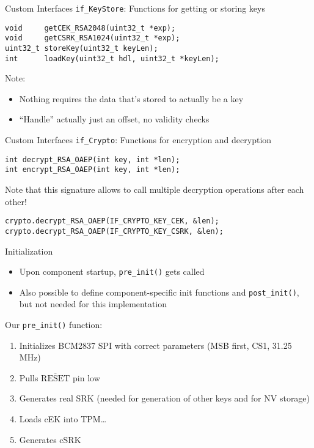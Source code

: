 \begin{frame}[fragile]{Custom Interfaces}
\texttt{if\_KeyStore}: Functions for getting or storing keys

\begin{verbatim}
void     getCEK_RSA2048(uint32_t *exp);
void     getCSRK_RSA1024(uint32_t *exp);
uint32_t storeKey(uint32_t keyLen);
int      loadKey(uint32_t hdl, uint32_t *keyLen);
\end{verbatim}

Note:
\begin{itemize}
\item Nothing requires the data that's stored to actually be a key
\item ``Handle'' actually just an offset, no validity checks
\end{itemize}
\end{frame}

\begin{frame}[fragile]{Custom Interfaces}
\texttt{if\_Crypto}: Functions for encryption and decryption

\begin{verbatim}
int decrypt_RSA_OAEP(int key, int *len);
int encrypt_RSA_OAEP(int key, int *len);
\end{verbatim}

Note that this signature allows to call multiple decryption operations after each other!

\begin{verbatim}
crypto.decrypt_RSA_OAEP(IF_CRYPTO_KEY_CEK, &len);
crypto.decrypt_RSA_OAEP(IF_CRYPTO_KEY_CSRK, &len);
\end{verbatim}
\end{frame}

\begin{frame}{Initialization}
\begin{itemize}
\item Upon component startup, \texttt{pre\_init()} gets called
\item Also possible to define component-specific init functions and \texttt{post\_init()}, but not needed for this implementation
\end{itemize}

Our \texttt{pre\_init()} function:

\begin{enumerate}
\item Initializes BCM2837 SPI with correct parameters (MSB first, CS1, 31.25 MHz)
\item Pulls $\overline{\mbox{RESET}}$ pin low
\item Generates real SRK (needed for generation of other keys and for NV storage)
\item Loads cEK into TPM\ldots
\item Generates cSRK
\end{enumerate}
\end{frame}

